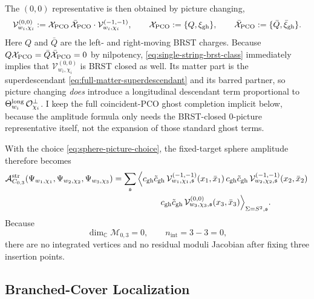 \documentclass[11pt]{article}
\newcommand{\mc}[1]{\mathcal{#1}}
\newcommand{\bC}{\mathbb{C}}
\newcommand{\gh}{\mathrm{gh}}
\begin{document}
The $(0,0)$ representative is then obtained by picture changing,
\begin{equation}\label{eq:longitudinal-zero-picture}
\mc V^{(0,0)}_{w_i,\chi_i}
:=
\mc X_{\rm PCO}\,\bar{\mc X}_{\rm PCO}\cdot
\mc V^{(-1,-1)}_{w_i,\chi_i},
\qquad
\mc X_{\rm PCO}:=\{Q,\xi_{\gh}\},
\qquad
\bar{\mc X}_{\rm PCO}:=\{\bar Q,\bar\xi_{\gh}\}.
\end{equation}
Here $Q$ and $\bar Q$ are the left- and right-moving BRST charges.
Because $Q\mc X_{\rm PCO}=\bar Q\bar{\mc X}_{\rm PCO}=0$ by nilpotency, \eqref{eq:single-string-brst-class} immediately implies that $\mc V^{(0,0)}_{w_i,\chi_i}$ is BRST closed as well. Its matter part is the superdescendant \eqref{eq:full-matter-superdescendant} and its barred partner, so picture changing \emph{does} introduce a longitudinal descendant term proportional to $\Theta^{\rm long}_{w_i}\,\mc O_{\chi_i}^\perp$. I keep the full coincident-PCO ghost completion implicit below, because the amplitude formula only needs the BRST-closed $0$-picture representative itself, not the expansion of those standard ghost terms.

With the choice \eqref{eq:sphere-picture-choice}, the fixed-target sphere amplitude therefore becomes
\begin{equation}\label{eq:fixed-cover-correlator}
\begin{aligned}
\mc A^{\rm str}_{C_{0,3}}(\Psi_{w_1,\chi_1},\Psi_{w_2,\chi_2},\Psi_{w_3,\chi_3})
&=
\sum_{\mathfrak s}
\Big\langle
c_{\rm gh}\tilde c_{\rm gh}\,\mc V^{(-1,-1)}_{w_1,\chi_1,\mathfrak s}(x_1,\bar x_1)\,
c_{\rm gh}\tilde c_{\rm gh}\,\mc V^{(-1,-1)}_{w_2,\chi_2,\mathfrak s}(x_2,\bar x_2)\,
\\
&\hspace{2cm}
c_{\rm gh}\tilde c_{\rm gh}\,\mc V^{(0,0)}_{w_3,\chi_3,\mathfrak s}(x_3,\bar x_3)
\Big\rangle_{\Sigma=S^2,\mathfrak s}.
\end{aligned}
\end{equation}
Because
\begin{equation}\label{eq:sphere-three-point-no-moduli}
\dim_{\bC}\mc M_{0,3}=0,
\qquad
n_{\mathrm{int}}=3-3=0,
\end{equation}
there are no integrated vertices and no residual moduli Jacobian after fixing three insertion points.

\subsection{Branched-Cover Localization}
\end{document}
